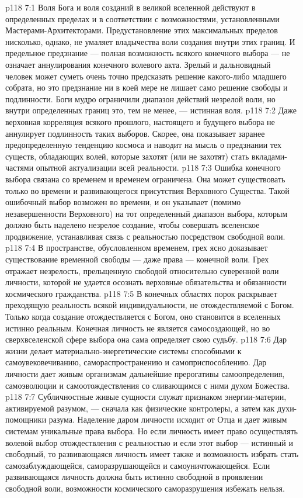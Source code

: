 \vs p118 7:1 Воля Бога и воля созданий в великой вселенной действуют в определенных пределах и в соответствии с возможностями, установленными Мастерами\hyp{}Архитекторами. Предустановление этих максимальных пределов нисколько, однако, не умаляет владычества воли создания внутри этих границ. И предельное предзнание --- полная возможность всякого конечного выбора --- не означает аннулирования конечного волевого акта. Зрелый и дальновидный человек может суметь очень точно предсказать решение какого\hyp{}либо младшего собрата, но это предзнание ни в коей мере не лишает само решение свободы и подлинности. Боги мудро ограничили диапазон действий незрелой воли, но внутри определенных границ это, тем не менее, --- истинная воля.
\vs p118 7:2 Даже верховная корреляция всякого прошлого, настоящего и будущего выбора не аннулирует подлинность таких выборов. Скорее, она показывает заранее предопределенную тенденцию космоса и наводит на мысль о предзнании тех существ, обладающих волей, которые захотят (или не захотят) стать вкладами\hyp{}частями опытной актуализации всей реальности.
\vs p118 7:3 \pc Ошибка конечного выбора связана со временем и временем ограничена. Она может существовать только во времени и  развивающегося присутствия Верховного Существа. Такой ошибочный выбор возможен во времени, и он указывает (помимо незавершенности Верховного) на тот определенный диапазон выбора, которым должно быть наделено незрелое создание, чтобы совершать вселенское продвижение, устанавливая связь с реальностью посредством свободной воли.
\vs p118 7:4 В пространстве, обусловленном временем, грех ясно доказывает существование временной свободы --- даже права --- конечной воли. Грех отражает незрелость, прельщенную свободой относительно суверенной воли личности, которой не удается осознать верховные обязательства и обязанности космического гражданства.
\vs p118 7:5 В конечных областях порок раскрывает преходящую реальность всякой индивидуальности, не отождествляемой с Богом. Только когда создание отождествляется с Богом, оно становится в вселенных истинно реальным. Конечная личность не является самосоздающей, но во сверхвселенской сфере выбора она сама определяет свою судьбу.
\vs p118 7:6 \pc Дар жизни делает материально\hyp{}энергетические системы способными к самоувековечиванию, самораспространению и самоприспособлению. Дар личности дает живым организмам дальнейшие прерогативы самоопределения, самоэволюции и самоотождествления со сливающимся с ними духом Божества.
\vs p118 7:7 Субличностные живые сущности служат признаком энергии\hyp{}материи, активируемой разумом, --- сначала как физические контролеры, а затем как духи\hyp{}помощники разума. Наделение даром личности исходит от Отца и дает живым системам уникальные права выбора. Но если личность имеет право осуществлять волевой выбор отождествления с реальностью и если этот выбор --- истинный и свободный, то развивающаяся личность имеет также и возможность избрать стать самозаблуждающейся, саморазрушающейся и самоуничтожающейся. Если развивающаяся личность должна быть истинно свободной в проявлении свободной воли, возможности космического саморазрушения избежать нельзя.
